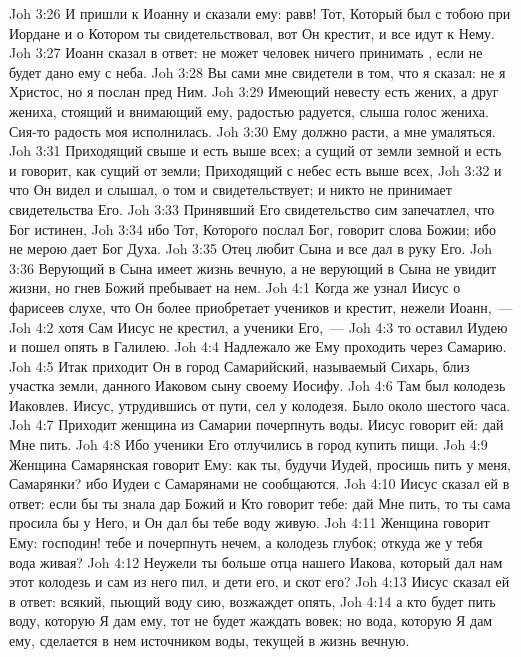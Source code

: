 \vs Joh 3:26 И пришли к Иоанну и сказали ему: равв! Тот, Который был с тобою при Иордане и о Котором ты свидетельствовал, вот Он крестит, и все идут к Нему.
\vs Joh 3:27 Иоанн сказал в ответ: не может человек ничего принимать , если не будет дано ему с неба.
\vs Joh 3:28 Вы сами мне свидетели в том, что я сказал: не я Христос, но я послан пред Ним.
\vs Joh 3:29 Имеющий невесту есть жених, а друг жениха, стоящий и внимающий ему, радостью радуется, слыша голос жениха. Сия-то радость моя исполнилась.
\vs Joh 3:30 Ему должно расти, а мне умаляться.
\vs Joh 3:31 Приходящий свыше и есть выше всех; а сущий от земли земной и есть и говорит, как сущий от земли; Приходящий с небес есть выше всех,
\vs Joh 3:32 и что Он видел и слышал, о том и свидетельствует; и никто не принимает свидетельства Его.
\vs Joh 3:33 Принявший Его свидетельство сим запечатлел, что Бог истинен,
\vs Joh 3:34 ибо Тот, Которого послал Бог, говорит слова Божии; ибо не мерою дает Бог Духа.
\vs Joh 3:35 Отец любит Сына и все дал в руку Его.
\vs Joh 3:36 Верующий в Сына имеет жизнь вечную, а не верующий в Сына не увидит жизни, но гнев Божий пребывает на нем.
\vs Joh 4:1 Когда же узнал Иисус о  фарисеев слухе, что Он более приобретает учеников и крестит, нежели Иоанн,~---
\vs Joh 4:2 хотя Сам Иисус не крестил, а ученики Его,~---
\vs Joh 4:3 то оставил Иудею и пошел опять в Галилею.
\rsbpar\vs Joh 4:4 Надлежало же Ему проходить через Самарию.
\vs Joh 4:5 Итак приходит Он в город Самарийский, называемый Сихарь, близ участка земли, данного Иаковом сыну своему Иосифу.
\vs Joh 4:6 Там был колодезь Иаковлев. Иисус, утрудившись от пути, сел у колодезя. Было около шестого часа.
\vs Joh 4:7 Приходит женщина из Самарии почерпнуть воды. Иисус говорит ей: дай Мне пить.
\vs Joh 4:8 Ибо ученики Его отлучились в город купить пищи.
\vs Joh 4:9 Женщина Самарянская говорит Ему: как ты, будучи Иудей, просишь пить у меня, Самарянки? ибо Иудеи с Самарянами не сообщаются.
\vs Joh 4:10 Иисус сказал ей в ответ: если бы ты знала дар Божий и Кто говорит тебе: дай Мне пить, то ты сама просила бы у Него, и Он дал бы тебе воду живую.
\vs Joh 4:11 Женщина говорит Ему: господин! тебе и почерпнуть нечем, а колодезь глубок; откуда же у тебя вода живая?
\vs Joh 4:12 Неужели ты больше отца нашего Иакова, который дал нам этот колодезь и сам из него пил, и дети его, и скот его?
\vs Joh 4:13 Иисус сказал ей в ответ: всякий, пьющий воду сию, возжаждет опять,
\vs Joh 4:14 а кто будет пить воду, которую Я дам ему, тот не будет жаждать вовек; но вода, которую Я дам ему, сделается в нем источником воды, текущей в жизнь вечную.

